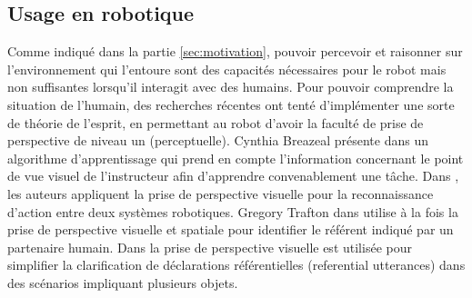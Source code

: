 \documentclass[a4paper,11pt,twoside]{StyleThese}
\begin{document}





\subsection{Usage en robotique}

Comme indiqué dans la partie \ref{sec:motivation}, pouvoir percevoir et raisonner sur l'environnement qui l'entoure sont des capacités nécessaires pour le robot mais non suffisantes lorsqu'il interagit avec des humains. Pour pouvoir comprendre la situation de l'humain, des recherches récentes ont tenté d'implémenter une sorte de théorie de l'esprit, en permettant au robot d'avoir la faculté de prise de perspective de niveau un (perceptuelle). Cynthia Breazeal présente dans \cite{breazeal2006} un algorithme d'apprentissage qui prend en compte l'information concernant le point de vue visuel de l'instructeur afin d'apprendre convenablement une tâche. Dans \cite{Johnson2005}, les auteurs appliquent la prise de perspective visuelle pour la reconnaissance d'action entre deux systèmes robotiques. Gregory Trafton dans \cite{Trafton2005} utilise à la fois la prise de perspective visuelle et spatiale pour identifier le référent indiqué par un partenaire humain. Dans \cite{ros2010one} la prise de perspective visuelle est utilisée pour simplifier la clarification de déclarations référentielles (referential utterances) dans des scénarios impliquant plusieurs objets.
\end{document}
